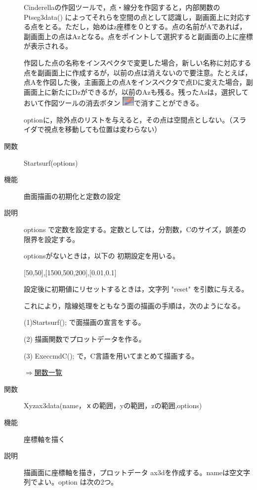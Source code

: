 \documentclass[papersize,a4paper,12pt,uplatex]{jsarticle}
\begin{document}
\begin{description}
Cinderellaの作図ツールで，点・線分を作図すると，内部関数の Ptseg3data() によってそれらを空間の点として認識し，副画面上に対応する点をとる。ただし，始めはz座標を０とする。点の名前がAであれば，副画面上の点はAzとなる。点をポイントして選択すると副画面の上に座標が表示される。

作図した点の名称をインスペクタで変更した場合，新しい名称に対応する点を副画面上に作成するが，以前の点は消えないので要注意。たとえば，点Aを作図した後，主画面上の点Aをインスペクタで点Dに変えた場合，副画面上に新たにDzができるが，以前のAzも残る。残ったAzは，選択しておいて作図ツールの消去ボタン \includegraphics[bb=0 0 6.48 5.04 , width=0.6cm]{Fig/delete.pdf}で消すことができる。

optionに，除外点のリストを与えると，その点は空間点としない。（スライダで視点を移動しても位置は変わらない）

\vspace{\baselineskip}
\hypertarget{startsurf}{}
\item[関数]Startsurf(options)
\item[機能]曲面描画の初期化と定数の設定
\item[説明]options で定数を設定する。定数としては，分割数，Cのサイズ，誤差の限界を設定する。

optionsがないときは，以下の 初期設定を用いる。

 [50,50],[1500,500,200],[0.01,0.1]

設定後に初期値にリセットするときは，文字列 "reset" を引数に与える。

これにより，陰線処理をともなう面の描画の手順は，次のようになる。

(1)Startsurf(); で面描画の宣言をする。

(2) 描画関数でプロットデータを作る。

(3) ExeccmdC(); で，C言語を用いてまとめて描画する。

\begin{flushright} \hyperlink{functionlist}{$\Rightarrow$関数一覧}\end{flushright}
\vspace{\baselineskip}
\hypertarget{xyzax3data}{}
\item[関数]Xyzax3data(name，ｘの範囲，yの範囲，zの範囲,options)
\item[機能]座標軸を描く
\item[説明]描画面に座標軸を描き，プロットデータ ax3dを作成する。nameは空文字列でよい。option は次の2つ。


\end{description}
\end{document}
